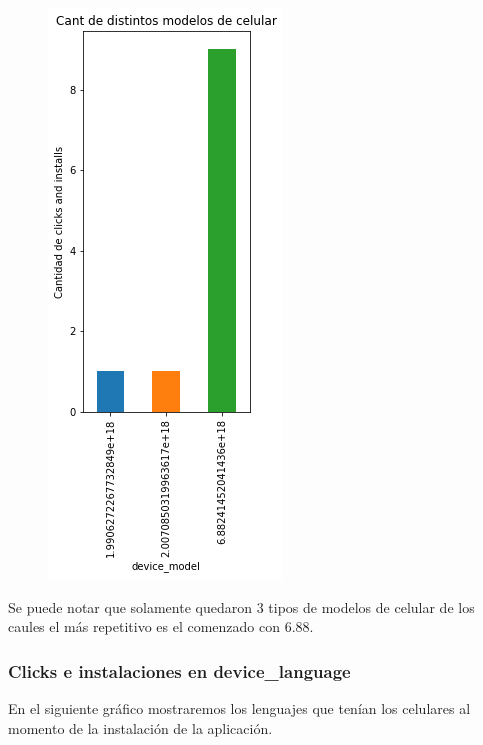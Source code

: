 \documentclass[a4paper, 12pt]{article}
\newcommand\tab[1][1cm]{\hspace*{#1}}
\begin{document}
{{	\FloatBarrier
		\begin{figure}[h]
			\centering
			\includegraphics[scale = 0.5]{images/clicks-installs/device_model.png}
			\caption{}
		\end{figure}
	\FloatBarrier

	\tab Se puede notar que solamente quedaron 3 tipos de modelos de celular de los caules el más repetitivo es el comenzado con 6.88.
	
	\subsubsection{Clicks e instalaciones en device\_language}
	\tab En el siguiente gráfico mostraremos los lenguajes que tenían los celulares al momento de la instalación de la aplicación.
	
}}
\end{document}
